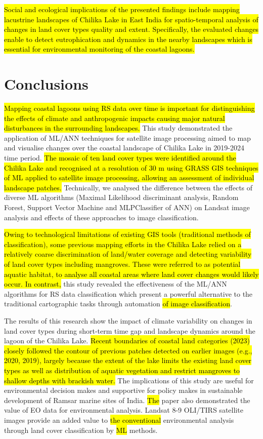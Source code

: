 \documentclass[jmse,article,submit,pdftex,moreauthors]{Definitions/mdpi}
\begin{document}
\hl{Social and ecological implications of the presented findings include mapping lacustrine landscapes of Chilika Lake in East India for spatio-temporal analysis of changes in land cover types quality and extent. Specifically, the evaluated changes enable to detect eutrophication and dynamics in the nearby landscapes which is essential for environmental monitoring of the coastal lagoons.}

\section{Conclusions}

\hl{Mapping coastal lagoons using RS data over time is important for distinguishing the effects of climate and anthropogenic impacts causing major natural disturbances in the surrounding landscapes. }This study demonstrated the application of ML/ANN techniques for satellite image processing aimed to map and visualise changes over the coastal landscape of Chilika Lake in 2019-2024 time period. \hl{The mosaic of ten land cover types were identified around the Chilika Lake and recognised at a resolution of 30 m using GRASS GIS techniques of ML applied to satellite image processing, allowing an assessment of individual landscape patches. }Technically, we analysed the difference between the effects of diverse ML algorithms (Maximal Likelihood discriminant analysis, Random Forest, Support Vector Machine and MLPClassifier of ANN) on Landsat image analysis and effects of these approaches to image classification. 

\hl{Owing to technological limitations of existing GIS tools (traditional methods of classification), some previous mapping efforts in the Chilika Lake relied on a relatively coarse discrimination of land/water coverage and detecting variability of land cover types including mangroves. These were referred to as potential aquatic habitat, to analyse all coastal areas where land cover changes would likely occur. In contrast, }this study revealed the effectiveness of the ML/ANN algorithms for RS data classification which present a powerful alternative to the traditional cartographic tasks through automation \hl{of image classification}. 

The results of this research show the impact of climate variability on changes in land cover types during short-term time gap and landscape dynamics around the lagoon of the Chilika Lake. \hl{Recent boundaries of coastal land categories (2023) closely followed the contour of previous patches detected on earlier images (e.g., 2020, 2019), largely because the extent of the lake limits the existing land cover types as well as distribution of aquatic vegetation  and restrict mangroves to shallow depths with brackish water. }The implications of this study are useful for environmental decision makes and supportive for policy makes in sustainable development of Ramsar marine sites of India. \hl{The} paper also demonstrated the value of EO data for environmental analysis. Landsat 8-9 OLI/TIRS satellite images provide an added value to \hl{the conventional} environmental analysis through land cover classification by \hl{ML} methods. 
\end{document}
